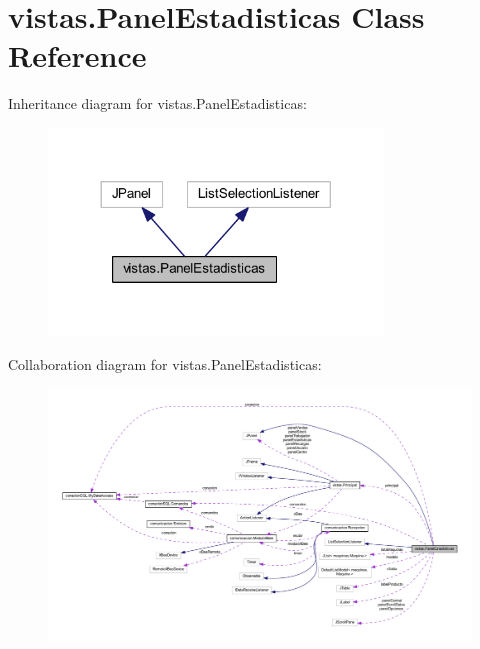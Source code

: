 \hypertarget{classvistas_1_1_panel_estadisticas}{}\section{vistas.\+Panel\+Estadisticas Class Reference}
\label{classvistas_1_1_panel_estadisticas}


Inheritance diagram for vistas.\+Panel\+Estadisticas\+:
\nopagebreak
\begin{figure}[H]
\begin{center}
\leavevmode
\includegraphics[width=252pt]{classvistas_1_1_panel_estadisticas__inherit__graph}
\end{center}
\end{figure}


Collaboration diagram for vistas.\+Panel\+Estadisticas\+:
\nopagebreak
\begin{figure}[H]
\begin{center}
\leavevmode
\includegraphics[width=350pt]{classvistas_1_1_panel_estadisticas__coll__graph}
\end{center}
\end{figure}

